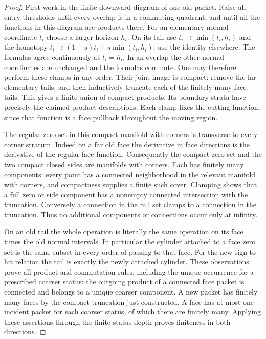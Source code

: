\documentclass[11pt]{article}
\numberwithin{equation}{section}
\theoremstyle{definition}
\theoremstyle{remark}
\begin{document}
\begin{proof}
First work in the finite downward diagram of one old packet.  Raise
all entry thresholds until every overlap is in a commuting quadrant,
and until all the functions in this diagram are products there.
For an elementary normal coordinate $t_i$ choose a larger horizon $h_i$.
On its tail use
$t_i\mapsto\min(t_i,h_i)$ and the homotopy
$t_i\mapsto(1-s)t_i+s\min(t_i,h_i)$; use the identity elsewhere.
The formulas agree continuously at $t_i=h_i$.  In an overlap the
other normal coordinates are unchanged and the formulas commute.
One may therefore perform these clamps in any order.  Their joint image
is compact: remove the far elementary tails, and then inductively
truncate each of the finitely many face tails.  This gives a finite
union of compact products.  Its boundary strata have precisely the
claimed product descriptions.  Each clamp fixes the cutting function,
since that function is a face pullback throughout the moving region.

The regular zero set in this compact manifold with corners is transverse
to every corner stratum.  Indeed on a far old face the derivative in
face directions is the derivative of the regular face function.
Consequently the compact zero set and the two compact closed sides are
manifolds with corners.  Each has finitely many components: every point
has a connected neighborhood in the relevant manifold with corners,
and compactness supplies a finite such cover.  Clamping shows that a
full zero or side component has a nonempty connected intersection with
the truncation.  Conversely a connection in the full set clamps to a
connection in the truncation.  Thus no additional components or
connections occur only at infinity.

On an old tail the whole operation is literally the same operation on
its face times the old normal intervals.  In particular the cylinder
attached to a face zero set is the same subset in every order of
passing to that face.  For the new sign-to-hit relation the tail is
exactly the newly attached cylinder.  These observations prove all
product and commutation rules, including the unique occurrence for
a prescribed coarser status: the outgoing product of a connected face
packet is connected and belongs to a unique coarser component.
A new packet has finitely many faces by the compact truncation just
constructed.  A face has at most one incident packet for each coarser
status, of which there are finitely many.  Applying these assertions
through the finite status depth proves finiteness in both directions.


\end{proof}
\end{document}
